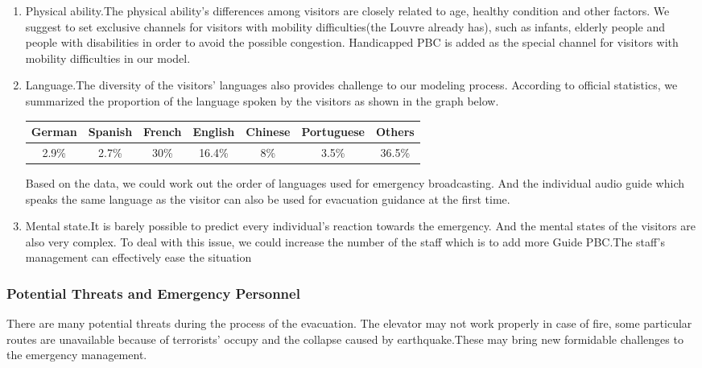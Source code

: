 \documentclass[12pt]{article}
\begin{document}
\begin{enumerate}
	

\item Physical ability.The physical ability's differences among 
visitors are closely related to age, healthy condition and other factors. 
We suggest to set exclusive channels for visitors with mobility difficulties(the Louvre already has), 
such as infants, elderly people and people with disabilities in order 
to avoid the possible congestion. Handicapped PBC is added as the special channel
for visitors with mobility difficulties in our model.

\item Language.The diversity of the visitors' languages also provides challenge to our modeling process. According to official statistics, we summarized the proportion of the language spoken by the visitors as shown in the graph below.\cite{12}

\renewcommand\arraystretch{1.8}
\begin{tabular}{|c|c|c|c|c|c|c|}
    \hline
    German & Spanish & French & English & Chinese & Portuguese & Others \\
    \hline
    2.9\% & 2.7\% & 30\% & 16.4\% & 8\% & 3.5\% & 36.5\% \\
    \hline
\end{tabular}


Based on the data, we could work out the order of languages used for 
emergency broadcasting. And the individual audio guide which speaks the same language as the visitor can also be used for evacuation guidance at the first time. 

\item Mental state.It is barely possible to predict every individual's reaction 
towards the emergency. And the mental states of the visitors are also very 
complex. To deal with this issue, we could increase the number of the staff 
which is to add more Guide PBC.The staff's management can effectively ease the situation\cite{13}

\end{enumerate}

\subsubsection{Potential Threats and Emergency Personnel}
There are many potential threats during the process of the evacuation. 
The elevator may not work properly in case of fire, some particular 
routes are unavailable because of terrorists' occupy and the collapse 
caused by earthquake.These may bring new formidable challenges to the emergency 
management. 
\end{document}

